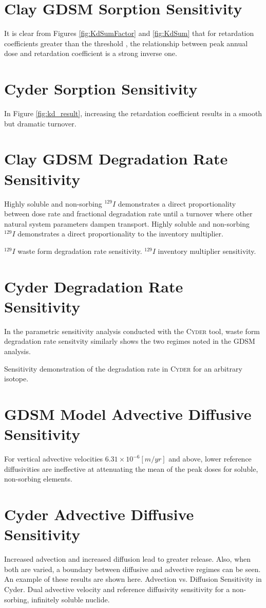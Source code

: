 \documentclass[letterpaper]{article}
\newcommand{\Cyder}{\textsc{Cyder}\xspace}
\begin{document}
{\section{Clay GDSM Sorption Sensitivity}
It is clear from Figures \ref{fig:KdSumFactor} and \ref{fig:KdSum} that 
for retardation coefficients greater than the threshold , the 
relationship between peak annual dose and retardation coefficient is a strong 
inverse one. 
\section{Cyder Sorption Sensitivity}

In Figure \ref{fig:kd_result}, increasing the retardation 
coefficient results in a smooth but dramatic turnover. 


\section{Clay GDSM Degradation Rate Sensitivity}

Highly soluble and non-sorbing $^{129}I$ demonstrates a direct proportionality between dose rate and 
fractional degradation rate until a turnover where other natural system 
parameters dampen transport. Highly soluble and non-sorbing $^{129}I$ demonstrates a direct 
proportionality to the inventory multiplier.

$^{129}I$ waste form degradation rate sensitivity.
$^{129}I$ inventory multiplier sensitivity.


\section{Cyder Degradation Rate Sensitivity}
In the parametric sensitivity analysis conducted with the \Cyder tool, waste 
form degradation rate sensitvity similarly shows the two regimes noted in the 
GDSM analysis.  

Sensitivity demonstration of the degradation rate in \Cyder for an 
arbitrary isotope.


\section{GDSM Model Advective Diffusive Sensitivity}
For vertical advective velocities 
$6.31\times10^{-6}[m/yr]$ and above, lower reference diffusivities are 
ineffective at attenuating the mean of the peak doses for soluble, non-sorbing 
elements. 

\section{Cyder Advective Diffusive Sensitivity}
Increased advection and increased diffusion lead to greater release. Also, when 
both are varied, a boundary between diffusive and advective
regimes can be seen. An example of these results are shown here.
Advection vs. Diffusion Sensitivity in Cyder. Dual advective velocity 
and reference diffusivity sensitivity for a non-sorbing, infinitely soluble 
nuclide.

}
\end{document}
